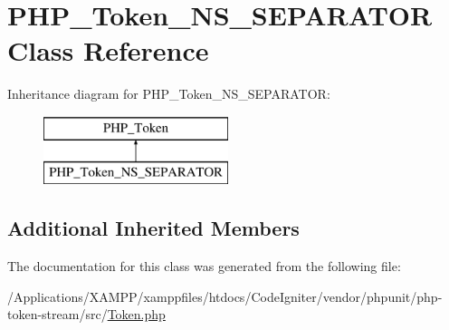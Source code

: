 \hypertarget{class_p_h_p___token___n_s___s_e_p_a_r_a_t_o_r}{}\section{P\+H\+P\+\_\+\+Token\+\_\+\+N\+S\+\_\+\+S\+E\+P\+A\+R\+A\+T\+OR Class Reference}
\label{class_p_h_p___token___n_s___s_e_p_a_r_a_t_o_r}
Inheritance diagram for P\+H\+P\+\_\+\+Token\+\_\+\+N\+S\+\_\+\+S\+E\+P\+A\+R\+A\+T\+OR\+:\begin{figure}[H]
\begin{center}
\leavevmode
\includegraphics[height=2.000000cm]{class_p_h_p___token___n_s___s_e_p_a_r_a_t_o_r}
\end{center}
\end{figure}
\subsection*{Additional Inherited Members}


The documentation for this class was generated from the following file\+:\begin{DoxyCompactItemize}
\item 
/\+Applications/\+X\+A\+M\+P\+P/xamppfiles/htdocs/\+Code\+Igniter/vendor/phpunit/php-\/token-\/stream/src/\mbox{\hyperlink{_token_8php}{Token.\+php}}\end{DoxyCompactItemize}
